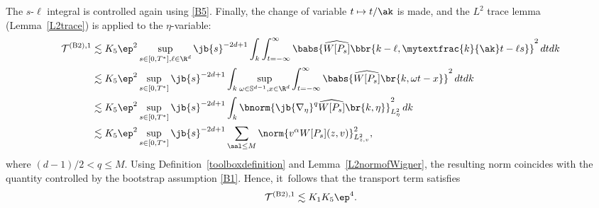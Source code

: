 The $s$-$\ell$ integral is controlled again using \eqref{B5}. Finally, the change of variable $t\mapsto t/\ak$ is made, and the $L^2$ trace lemma (Lemma~\ref{L2trace}) is applied to the $\eta$-variable:
\begin{align*}
\mathcal{T}^{\mathrm{(B2),1}}&\lesssim K_5\ep^2\sup_{s\in[0,T^*],\ell\in\R^d}\jb{s}^{-2d+1}\int_k\int_{t=-\infty}^\infty\babs{\widehat{W[P_s]}\bbr{k-\ell,\mytextfrac{k}{\ak}t-\ell s}}^2\,dtdk\\
&\lesssim K_5\ep^2\sup_{s\in[0,T^*]}\jb{s}^{-2d+1}\int_k\sup_{\omega\in \mathbb S^{d-1},x\in\R^d}\int_{t=-\infty}^\infty\babs{\widehat{W[P_s]}\br{k,\omega t-x}}^2\,dtdk\\
&\lesssim K_5\ep^2\sup_{s\in[0,T^*]}\jb{s}^{-2d+1}\int_k\bnorm{\jb{\nabla_\eta}^{q}\widehat{W[P_s]}\br{k,\eta}}_{L^2_\eta}^2\,dk\\
&\lesssim K_5\ep^2\sup_{s\in[0,T^*]}\jb{s}^{-2d+1}\sum_{\aal\leq M}\norm{v^\alpha W[P_s](z,v)}_{L^2_{z,v}}^2,
\end{align*}where $(d-1)/2<q\leq M$. Using Definition~\ref{toolboxdefinition} and Lemma~\ref{L2normofWigner}, the resulting norm coincides with the quantity controlled by the bootstrap assumption \eqref{B1}. Hence, it~follows that the transport term satisfies
\begin{align*}
\mathcal{T}^{\mathrm{(B2),1}}\lesssim K_1K_5\ep^4.
\end{align*}

